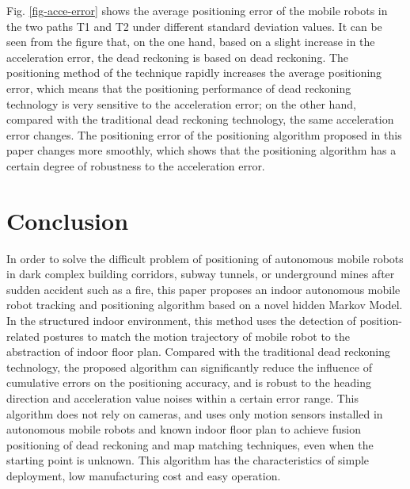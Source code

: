 \documentclass{llncs}
\begin{document}
Fig. \ref{fig-acce-error} shows the average positioning error of the mobile robots in the two paths T1 and T2 under different standard deviation values. It can be seen from the figure that, on the one hand, based on a slight increase in the acceleration error, the dead reckoning is based on dead reckoning. The positioning method of the technique rapidly increases the average positioning error, which means that the positioning performance of dead reckoning technology is very sensitive to the acceleration error; on the other hand, compared with the traditional dead reckoning technology, the same acceleration error changes. The positioning error of the positioning algorithm proposed in this paper changes more smoothly, which shows that the positioning algorithm has a certain degree of robustness to the acceleration error.
 

\section{Conclusion}

In order to solve the difficult problem of positioning of autonomous mobile robots in dark complex building corridors, subway tunnels, or underground mines after sudden accident such as a fire, this paper proposes an indoor autonomous mobile robot tracking and positioning algorithm based on a novel hidden Markov Model. In the structured indoor environment, this method uses the detection of position-related postures to match the motion trajectory of mobile robot to the abstraction of indoor floor plan. Compared with the traditional dead reckoning technology, the proposed algorithm can significantly reduce the influence of cumulative errors on the positioning accuracy, and is robust to the heading direction and acceleration value noises within a certain error range. This algorithm does not rely on cameras, and uses only motion sensors installed in autonomous mobile robots and known indoor floor plan to achieve fusion positioning of dead reckoning and map matching techniques, even when the starting point is unknown. This algorithm has the characteristics of simple deployment, low manufacturing cost and easy operation.

%
%

%
%
%

\end{document}
